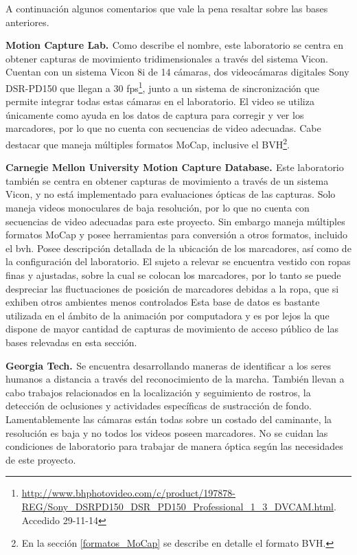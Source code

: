 A continuación algunos comentarios que vale la pena resaltar sobre  las bases anteriores.

\textbf{Motion Capture Lab. \cite{MCL}} %
		Como describe el nombre, este laboratorio se centra en obtener capturas de movimiento tridimensionales a través del sistema Vicon. Cuentan con un sistema Vicon 8i de 14 cámaras, dos videocámaras digitales Sony DSR-PD150 que llegan a 30 fps\footnote{\textcolor{blue}{{\scriptsize\underline{\url{http://www.bhphotovideo.com/c/product/197878-REG/Sony_DSRPD150_DSR_PD150_Professional_1_3_DVCAM.html}}}}. Accedido 29-11-14 }, junto a un sistema de sincronización que permite integrar todas estas cámaras en el laboratorio. El video se utiliza únicamente como ayuda en los datos de captura para corregir y ver los marcadores,  por lo que no cuenta con secuencias de video adecuadas. Cabe destacar que maneja múltiples formatos MoCap, inclusive el BVH\footnote{En la sección \ref{formatos_MoCap} se describe en detalle el formato BVH.}.

\textbf{Carnegie Mellon University Motion Capture Database. \cite{CMU}} \label{CMU}
 Este laboratorio también se centra en obtener capturas de movimiento a través de un sistema Vicon, y no está implementado para evaluaciones ópticas de las capturas. Solo maneja videos monoculares de baja resolución, por lo que no cuenta con secuencias de video adecuadas para este proyecto. Sin embargo maneja múltiples formatos MoCap y  posee herramientas para conversión a otros formatos, incluido el bvh. Posee descripción detallada de la ubicación de los marcadores, así como de la configuración del laboratorio. El sujeto a relevar se encuentra vestido con ropas finas y ajustadas, sobre la cual se colocan los marcadores, por lo tanto se puede despreciar las fluctuaciones de posición de marcadores debidas a la ropa, que si exhiben otros ambientes menos controlados  Esta base de datos es bastante utilizada en el ámbito de la  animación por computadora y es por lejos la que dispone de mayor cantidad de capturas de movimiento de acceso público de las bases relevadas en esta sección.

\textbf{Georgia Tech. \cite{GT} }
Se encuentra desarrollando maneras de identificar a los seres humanos a distancia a través del reconocimiento de la marcha. También llevan a cabo trabajos relacionados en la localización y seguimiento de rostros, la detección de oclusiones y actividades específicas de sustracción de fondo.
Lamentablemente las cámaras están todas sobre un costado del caminante, la resolución es baja y no todos los videos poseen marcadores. No se cuidan las condiciones de laboratorio para trabajar de manera óptica según las necesidades de este proyecto.


